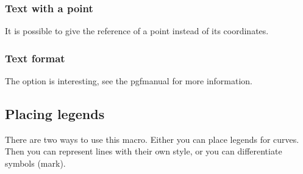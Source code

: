 \subsubsection{Text with a point}

It is possible to give the reference of a point instead of its coordinates.

\begin{tkzexample}[latex=8cm]
\end{tkzexample}

\subsubsection{Text format}

The option  is interesting, see the pgfmanual for more
information.

\begin{tkzexample}[latex=8cm,small]
\end{tkzexample}

\subsection{Placing legends}

There are two ways to use this macro. Either you can place legends for curves.
Then you can represent lines with their own style, or you can differentiate
symbols (mark).\hypertarget{legend}{}

